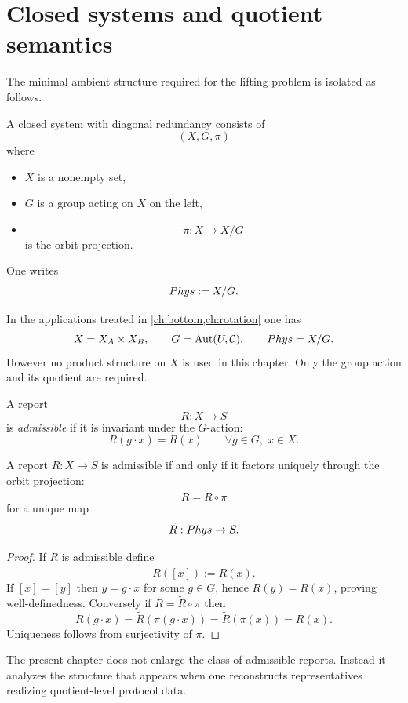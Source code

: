 \section{Closed systems and quotient semantics}
\label{sec:lift-setup}
The minimal ambient structure required for the lifting problem is isolated as follows.
\begin{definition}
	A closed system with diagonal redundancy consists of
	\[
		(X,G,\pi)
	\]
	where
	\begin{itemize}
		\item \(X\) is a nonempty set,
		\item \(G\) is a group acting on \(X\) on the left,
		\item
		      \[
			      \pi:X\to X/G
		      \]
		      is the orbit projection.
	\end{itemize}
	One writes
	\[
		Phys:=X/G .
	\]
\end{definition}
\begin{remark}
	In the applications treated in \cref{ch:bottom,ch:rotation} one has
	\[
		X=X_A\times X_B,
		\qquad
		G=\operatorname{Aut}(U,\mathcal C),
		\qquad
		Phys=X/G .
	\]
	However no product structure on \(X\) is used in this chapter.
	Only the group action and its quotient are required.
\end{remark}
\begin{definition}
	A report
	\[
		R:X\to S
	\]
	is \emph{admissible} if it is invariant under the \(G\)-action:
	\[
		R(g\cdot x)=R(x)
		\qquad
		\forall g\in G,\; x\in X .
	\]
\end{definition}
\begin{lemma}
	\label{lem:forced-descent}
	A report \(R:X\to S\) is admissible if and only if it factors uniquely
	through the orbit projection:
	\[
		R=\widetilde R\circ\pi
	\]
	for a unique map
	\[
		\widetilde R:Phys\to S .
	\]
\end{lemma}
\begin{proof}
	If \(R\) is admissible define
	\[
		\widetilde R([x]):=R(x).
	\]
	If \([x]=[y]\) then \(y=g\cdot x\) for some \(g\in G\), hence
	\(R(y)=R(x)\), proving well-definedness.
	Conversely if \(R=\widetilde R\circ\pi\) then
	\[
		R(g\cdot x)
		=\widetilde R(\pi(g\cdot x))
		=\widetilde R(\pi(x))
		=R(x).
	\]
	Uniqueness follows from surjectivity of \(\pi\).
\end{proof}
\begin{remark}
	The present chapter does not enlarge the class of admissible reports.
	Instead it analyzes the structure that appears when one reconstructs
	representatives realizing quotient-level protocol data.
\end{remark}
